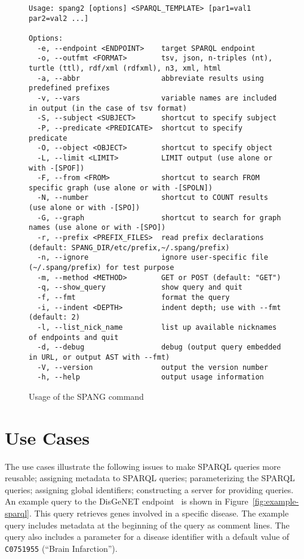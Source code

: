 \documentclass[runningheads]{llncs}
\begin{document}
\begin{figure}[!t]
\begin{scriptsize}
\begin{verbatim}
Usage: spang2 [options] <SPARQL_TEMPLATE> [par1=val1 par2=val2 ...]

Options:
  -e, --endpoint <ENDPOINT>    target SPARQL endpoint
  -o, --outfmt <FORMAT>        tsv, json, n-triples (nt), turtle (ttl), rdf/xml (rdfxml), n3, xml, html
  -a, --abbr                   abbreviate results using predefined prefixes
  -v, --vars                   variable names are included in output (in the case of tsv format)
  -S, --subject <SUBJECT>      shortcut to specify subject
  -P, --predicate <PREDICATE>  shortcut to specify predicate
  -O, --object <OBJECT>        shortcut to specify object
  -L, --limit <LIMIT>          LIMIT output (use alone or with -[SPOF])
  -F, --from <FROM>            shortcut to search FROM specific graph (use alone or with -[SPOLN])
  -N, --number                 shortcut to COUNT results (use alone or with -[SPO])
  -G, --graph                  shortcut to search for graph names (use alone or with -[SPO])
  -r, --prefix <PREFIX_FILES>  read prefix declarations (default: SPANG_DIR/etc/prefix,~/.spang/prefix)
  -n, --ignore                 ignore user-specific file (~/.spang/prefix) for test purpose
  -m, --method <METHOD>        GET or POST (default: "GET")
  -q, --show_query             show query and quit
  -f, --fmt                    format the query
  -i, --indent <DEPTH>         indent depth; use with --fmt (default: 2)
  -l, --list_nick_name         list up available nicknames of endpoints and quit
  -d, --debug                  debug (output query embedded in URL, or output AST with --fmt)
  -V, --version                output the version number
  -h, --help                   output usage information

\end{verbatim}
\end{scriptsize}
\caption{Usage of the SPANG command}
\label{fig:spang-command}
\end{figure}


\section{Use Cases}
The use cases illustrate the following issues to make SPARQL queries more reusable;
assigning metadata to SPARQL queries;
parameterizing the SPARQL queries;
assigning global identifiers;
constructing a server for providing queries.
An example query to the DisGeNET endpoint~\cite{disgenet} is shown in Figure~\ref{fig:example-sparql}.
This query retrieves genes involved in a specific disease.
The example query includes metadata at the beginning of the query as comment lines.
The query also includes a parameter for a disease identifier with a default value of \texttt{C0751955} (``Brain Infarction'').
\end{document}
